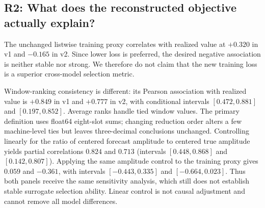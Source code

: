 \documentclass[11pt,a4paper]{article}
\begin{document}
\FloatBarrier
\subsection{R2: What does the reconstructed objective actually explain?}
\EqDiagnostic
{}
The unchanged listwise training proxy correlates with realized value at $+0.320$ in v1 and $-0.165$ in v2. Since lower loss is preferred, the desired negative association is neither stable nor strong. We therefore do not claim that the new training loss is a superior cross-model selection metric.

Window-ranking consistency is different: its Pearson association with realized value is $+0.849$ in v1 and $+0.777$ in v2, with conditional intervals $[0.472,0.881]$ and $[0.197,0.852]$. Average ranks handle tied window values. The primary definition uses float64 eight-slot sums; changing reduction order alters a few machine-level ties but leaves three-decimal conclusions unchanged. Controlling linearly for the ratio of centered forecast amplitude to centered true amplitude yields partial correlations $0.824$ and $0.713$ (intervals $[0.448,0.868]$ and $[0.142,0.807]$). Applying the same amplitude control to the training proxy gives $0.059$ and $-0.361$, with intervals $[-0.443,0.335]$ and $[-0.664,0.023]$. Thus both panels receive the same sensitivity analysis, which still does not establish stable surrogate selection ability. Linear control is not causal adjustment and cannot remove all model differences.
\end{document}

